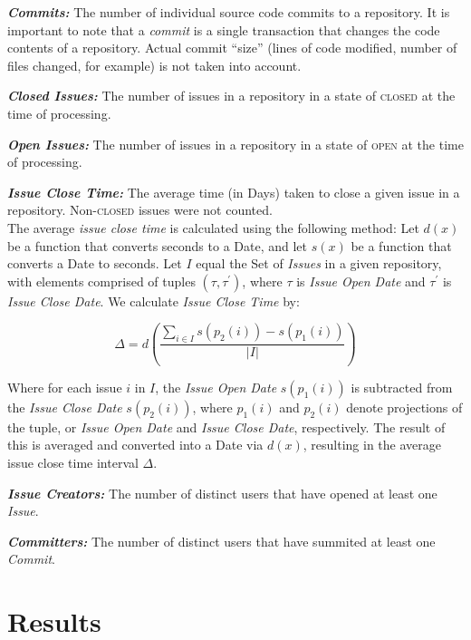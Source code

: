 \documentclass{proc}
\begin{document}
{{{{{{{\noindent \textbf{\textit{Commits:}}
The number of individual source code commits to a repository. It is important to note that a \textit{commit} is a single transaction that changes the code contents of a repository. Actual commit ``size'' (lines of code modified, number of files changed, for example) is not taken into account.

\noindent \textbf{\textit{Closed Issues:}}
The number of issues in a repository in a state of \textsc{closed} at the time of processing.

\noindent \textbf{\textit{Open Issues:}}
The number of issues in a repository in a state of \textsc{open} at the time of processing.

\noindent \textbf{\textit{Issue Close Time:}}
The average time (in Days) taken to close a given issue in a repository. Non-\textsc{closed} issues were not counted.\\

The average \textit{issue close time} is calculated using the following method: Let $d(x)$ be a function that converts seconds to a Date, and let $s(x)$ be a function that converts a Date to seconds. Let $I$ equal the Set of \textit{Issues} in a given repository, with elements comprised of tuples $(\tau, \tau^\prime)$, where $\tau$ is \textit{Issue Open Date} and $\tau^\prime$ is \textit{Issue Close Date}. We calculate \textit{Issue Close Time} by: 

\[ \Delta = d\left( \frac{\sum_{i \in I} s\left(p_{2}(i) \right) - s\left(p_{1}(i) \right)  } {|I|} \right) \]

Where for each issue $i$ in $I$, the \textit{Issue Open Date} $s( p_{1}(i))$ is subtracted from the \textit{Issue Close Date} $s( p_{2}(i))$, where $p_{1}(i)$ and $p_{2}(i)$ denote projections of the tuple, or \textit{Issue Open Date} and \textit{Issue Close Date}, respectively. The result of this is averaged and converted into a Date via $d(x)$, resulting in the average issue close time interval $\Delta$.

\noindent \textbf{\textit{Issue Creators:}}
The number of distinct users that have opened at least one \textit{Issue}.

\noindent \textbf{\textit{Committers:}}
The number of distinct users that have summited at least one \textit{Commit}.

\section{Results}

}}}}}}}
\end{document}

